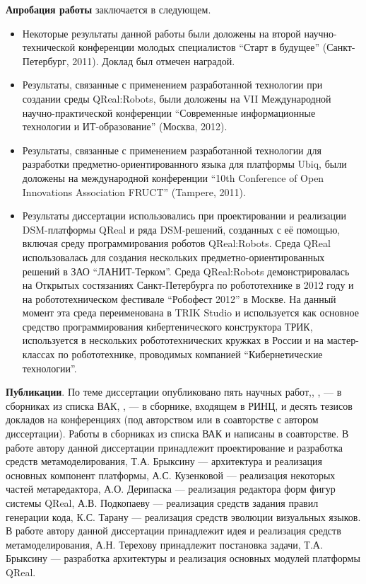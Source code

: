 \textbf{Апробация работы} заключается в следующем.
\begin{itemize}
	\item Некоторые результаты данной работы были доложены на второй 
		научно-технической конференции молодых специалистов "`Старт в будущее"' 
		(Санкт-Петербург, 2011). Доклад был отмечен наградой.
	\item Результаты, связанные с применением разработанной технологии при 
		создании среды QReal:Robots, были доложены на VII Международной 
		научно-практической конференции "`Современные информационные технологии 
		и ИТ-образование"' (Москва, 2012).
	\item Результаты, связанные с применением разработанной технологии для 
		разработки предметно-ориентированного языка для платформы Ubiq, были доложены 
		на международной конференции "`10th Conference of Open Innovations 
		Association FRUCT"' (Tampere, 2011).
	\item Результаты диссертации использовались при проектировании и реализации 
		DSM-платформы QReal и ряда DSM-решений, созданных с её помощью, включая 
		среду программирования роботов QReal:Robots. Среда QReal использовалась для 
		создания нескольких предметно-ориентированных решений в ЗАО “ЛАНИТ-Терком”. 
		Среда QReal:Robots демонстрировалась на Открытых состязаниях 
		Санкт-Петербурга по робототехнике в 2012 году и на робототехническом 
		фестивале "`Робофест 2012"' в Москве. На данный момент эта среда переименована в 
		TRIK Studio и используется как основное средство программирования 
		кибертенического конструктора ТРИК, используется в нескольких робототехнических 
		кружках в России и на мастер-классах по робототехнике, проводимых компанией "`Кибернетические технологии"'.
\end{itemize}

\textbf{Публикации}. По теме диссертации опубликовано пять научных работ,\cite{kuzenkova2011qreal}, 
\cite{litvinov2013robots}, \cite{terekhov2013qreal} --- в сборниках из списка ВАК, 
\cite{terekhov2009architecture}, \cite{osechkina2010gestures} --- в сборнике, входящем в РИНЦ, и 
десять тезисов докладов на конференциях (под авторством или в соавторстве с автором 
диссертации). Работы в сборниках из списка ВАК \cite{kuzenkova2011qreal} и \cite{terekhov2013qreal}
написаны в соавторстве. В работе \cite{kuzenkova2011qreal} автору данной диссертации 
принадлежит проектирование и разработка средств метамоделирования, Т.А. Брыксину --- архитектура и реализация основных
компонент платформы, А.С. Кузенковой --- реализация некоторых частей метаредактора, А.О. Дерипаска
--- реализация редактора форм фигур системы QReal, А.В. Подкопаеву --- реализация средств задания правил генерации кода,
К.С. Тарану --- реализация средств эволюции визуальных языков. В работе \cite{terekhov2013qreal}
автору данной диссертации принадлежит идея и реализация средств метамоделирования, А.Н. Терехову 
принадлежит постановка задачи, Т.А. Брыксину --- разработка архитектуры и реализация основных модулей платформы QReal.

